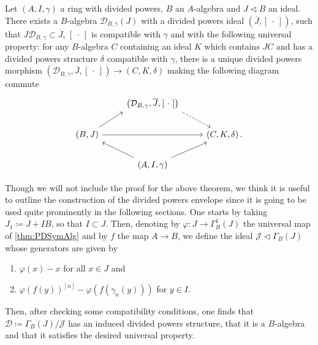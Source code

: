 \begin{thm}\label{thm:PDEnvelope}
	Let $\left(A, I, \gamma\right)$ a ring with divided powers, $B$ an $A$-algebra
	and $J \triangleleft B$ an ideal.
	There exists a $B$-algebra $\mathcal{D}_{B,\gamma}(J)$
	with a divided powers ideal $\left(\overline{J}, [\ \cdot \ ]\right)$,
	such that $J \mathcal{D}_{B, \gamma} \subset \overline{J}$,
	$[\ \cdot \ ]$ is compatible with $\gamma$ and with the
	following universal property:
	for any $B$-algebra $C$ containing an ideal
	$K$ which contains $JC$ and has a divided powers structure
	$\delta$ compatible  with $\gamma$, there is a unique 
	divided powers morphism 
	$\left(\mathcal{D}_{B,\gamma}, \overline{J}, [\ \cdot \ ]\right) \to 
	\left(C, K, \delta\right)$ making the following
	diagram commute
	\begin{equation*}
	\begin{tikzcd}
		&
		\left(\mathcal{D}_{B, \gamma}, \overline{J}, [\ \cdot \ ]\right)
		\arrow[rd, "", dashrightarrow,
		start anchor=south east] & \\
		\left(B, J\right) \arrow[ru, "", rightarrow,
		end anchor=south west] 
		\arrow[rr, "", rightarrow] & &
		\left(C, K, \delta\right). \\
		&
		\left(A, I, \gamma\right)
		\arrow[lu, "", rightarrow,
		start anchor=north west] 
		\arrow[ru, "", rightarrow,
		start anchor=north east] & 
	\end{tikzcd}
	\end{equation*}
\end{thm}


\begin{rem}[]\label{rem:PDEnvelope}
	Though we will not include the proof for the above theorem,
	we think it is useful to outline the construction of the divided powers envelope
	since it is going to be used quite prominently in the following sections.
	One starts by taking $J_1 \coloneqq J + IB$, so that $I \subset J$.
	Then, denoting by $\varphi\colon J \to \Gamma^1_B(J)$ the universal
	map of \cref{thm:PDSymAlg} and by $f$ the map $A \to B$, 
	we define the ideal $\mathcal{J} \triangleleft \Gamma_B(J)$
	whose generators are given by
\begin{enumerate}
	\item $\varphi(x) - x$ for all $x \in J$ and
	\item $\varphi(f(y))^{[n]} - \varphi(f(\gamma_n(y)))$ for $y \in I$.
\end{enumerate}
	Then, after checking some compatibility conditions, one finds that
	$\mathcal{D} \coloneqq \Gamma_B(J)/\mathcal{J}$ has an induced divided powers
	structure, that it is a $B$-algebra and that it satisfies the desired universal property.
\end{rem}


